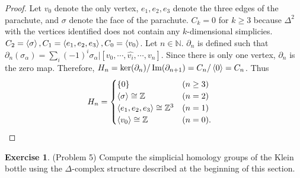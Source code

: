 \documentclass[12pt, psamsfonts]{amsart}
\theoremstyle{definition}
\newtheorem*{exer}{Exercise}
\theoremstyle{remark}
\numberwithin{equation}{section}
\begin{document}
\begin{proof}
  Let $v_0$ denote the only vertex, $e_1, e_2, e_3$ denote the three edges of the parachute, and $\sigma$ denote the face of the parachute.
  $C_k = 0$ for $k \geq 3$ because $\Delta^2$ with the vertices identified does not contain any $k$-dimensional simplicies.
  $C_2 = \ev{ \sigma}, C_1 = \ev{ e_1, e_2, e_3 }, C_0 = \ev{ v_0 }$.
  Let $n \in \mathbb{N}$.
  $\partial_n$ is defined such that $\partial_n(\sigma_{\alpha}) = \sum_{i}(-1)^i\sigma_{\alpha}\vert[v_0, \cdots, \hat{v_i}, \cdots, v_n]$.
  Since there is only one vertex, $\partial_n$ is the zero map.
  Therefore, $H_n = \ker(\partial_n) / \Im(\partial_{n + 1}) = C_n / \ev{ 0 } = C_n$.
  Thus
  \begin{align*}
    H_n &= \begin{cases}
      \{ 0 \} & (n \geq 3) \\
      \ev{ \sigma } \cong \mathbb{Z} & (n = 2) \\
      \ev{ e_1, e_2, e_3 } \cong \mathbb{Z}^3 & (n = 1) \\
      \ev{ v_0 } \cong \mathbb{Z} & (n = 0).
    \end{cases}
  \end{align*}
\end{proof}

\begin{exer}{(Problem 5)}
  Compute the simplicial homology groups of the Klein bottle using the $\Delta$-complex structure described at the beginning of this section.
\end{exer}
\end{document}

